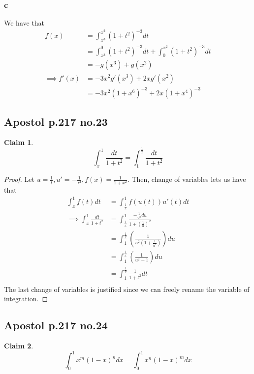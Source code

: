 \documentclass[12pt,letterpaper]{article}
\theoremstyle{definition}
\newtheorem*{claim}{Claim}
\begin{document}
\subsubsection*{c}

We have that
\begin{align*}
  f(x) &= \int_{x^3}^{x^2}(1+t^2)^{-3}dt \\
       &= \int_{x^3}^0(1+t^2)^{-3}dt + \int_0^{x^2}(1+t^2)^{-3}dt \\
       &= -g(x^3) + g(x^2) \\
  \implies f'(x) &= -3x^2g'(x^3) + 2xg'(x^2) \\
       &= -3x^2(1+x^6)^{-3} + 2x(1+x^4)^{-3}
\end{align*}

\subsection*{Apostol p.217 no.23}

\begin{claim}
  \[
    \int_x^1\frac{dt}{1+t^2} = \int_1^{\frac{1}{x}}\frac{dt}{1+t^2}
  \]
\end{claim}

\begin{proof}
  Let $u = \frac{1}{t}, u' = -\frac{1}{t^2}, f(x) = \frac{1}{1+x^2}$. Then, change of variables lets us have that
  \begin{align*}
    \int_x^1f(t)dt &= \int_{\frac{1}{x}}^1f(u(t))u'(t)dt \\
    \implies \int_x^1\frac{dt}{1+t^2} &= \int_{\frac{1}{x}}^1\frac{-\frac{1}{u^2}du}{1+(\frac{1}{u})^2} \\
                   &= \int_1^{\frac{1}{x}}(\frac{1}{u^2(1 + \frac{1}{u^2})})du \\
                   &= \int_1^{\frac{1}{x}}(\frac{1}{u^2 + 1})du \\
                   &= \int_1^{\frac{1}{x}}\frac{1}{1 + t^2}dt \\
    \end{align*}
  The last change of variables is justified since we can freely rename the
  variable of integration.
\end{proof}

\subsection*{Apostol p.217 no.24}

\begin{claim}
  \[
    \int_0^1 x^m(1-x)^ndx = \int_0^1x^n(1-x)^mdx
  \]
\end{claim}
\end{document}
